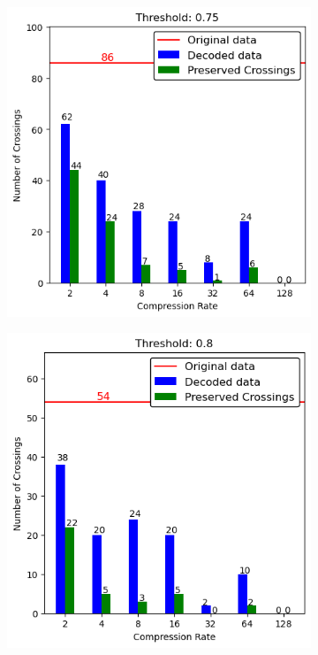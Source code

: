 \begin{appendices}
\begin{figure}
\begin{subfigure}{.5\textwidth}
	\end{subfigure}
	\hfill
	\begin{subfigure}{.5\textwidth}
		\includegraphics[width=\textwidth]{../../Images/spikes_threshold_075.png}
	\end{subfigure}
	\begin{subfigure}{.5\textwidth}
		\includegraphics[width=\textwidth]{../../Images/spikes_threshold_08.png}

\end{subfigure}
\end{figure}
\end{appendices}
